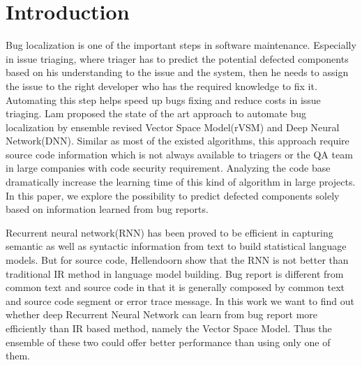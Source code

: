 \section{Introduction}
Bug localization is one of the important steps in software maintenance.
Especially in issue triaging, where triager has to predict the potential defected components based on his understanding to the issue and the system, then he needs to assign the issue to the right developer who has the required knowledge to fix it.
Automating this step helps speed up bugs fixing and reduce costs in issue triaging.
Lam \etal\cite{lam2017bug} proposed the state of the art approach to automate bug localization by ensemble revised Vector Space Model(rVSM)\cite{zhou2012should} and Deep Neural Network(DNN).  
Similar as most of the existed algorithms, this approach require source code information which is not always available to triagers or the QA team in large companies with code security requirement.
Analyzing the code base dramatically increase the learning time of this kind of algorithm in large projects.
In this paper, we explore the possibility to predict defected components solely based on information learned from bug reports.

Recurrent neural network(RNN) has been proved to be efficient in capturing semantic as well as syntactic information from text to build statistical language models.
But for source code, Hellendoorn \etal show that the RNN is not better than traditional IR method in language model building\cite{hellendoorn2017deep}.
Bug report is different from common text and source code in that it is generally composed by common text and source code segment or error trace message. 
In this work we want to find out whether deep Recurrent Neural Network can learn from bug report more efficiently than IR based method, namely the Vector Space Model. 
Thus the ensemble of these two could offer better performance than using only one of them.

